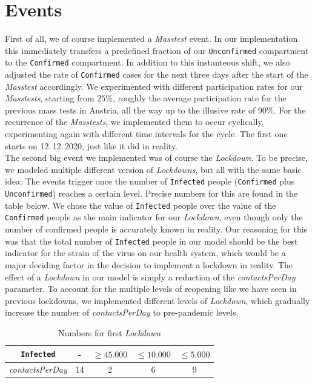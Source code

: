\documentclass
[
    a4paper,
    11pt,
    bibliography = totoc,
    listof = totoc,
    headinclude = true,
]
{scrreport}
\begin{document}
\section{Events}

First of all, we of course implemented a \textit{Masstest} event. In our implementation
this immediately transfers a predefined fraction of our \texttt{Unconfirmed} compartment
to the \texttt{Confirmed} compartment. In addition to this instanteous shift, we also
adjusted the rate of \texttt{Confirmed} cases for the next three days after the start of
the \textit{Masstest} accordingly. We experimented with different participation rates
for our \textit{Masstests}, starting from $25\%$, roughly the average participation rate
for the previous mass tests in Austria, all the way up to the illusive rate of $90\%$.
For the recurrence of the \textit{Masstests}, we implemented them to occur cyclically,
experimenting again with different time intervals for the cycle. The first one
starts on 12.\,12.\,2020, just like it did in reality.\\

The second big event we implemented was of course the \textit{Lockdown}. To be precise,
we modeled multiple different version of \textit{Lockdowns}, but all with the same basic idea:
The events trigger once the number of \texttt{Infected} people (\texttt{Confirmed} plus \texttt{Unconfirmed})
reaches a certain level. Precise numbers for this are found in the table below.
We chose the value of \texttt{Infected} people over the value of
the \texttt{Confirmed} people as the main indicator for our \textit{Lockdown}, even though only the number of confirmed people is accurately known in reality.
Our reasoning for this was that the total number of \texttt{Infected} people in our
model should be the best indicator for the strain of the virus on our health system,
which would be a major deciding factor in the decision to implement a lockdown in reality.
The effect of a \textit{Lockdown} in our model is simply a reduction of the \textit{contactsPerDay} parameter.
To account for the multiple levels of reopening like we have seen in previous
lockdowns, we implemented different levels of \textit{Lockdown}, which gradually increase
the number of \textit{contactsPerDay} to pre-pandemic levels.
\begin{table}[!h]
  \begin{center}
  \begin{tabular}{|c||c|c|c|c|}
  \hline
    \texttt{Infected} &- & $\geq 45.000$ & $\leq 10.000$ & $\leq 5.000$ \\
    \hline
    \textit{contactsPerDay} & 14 & 2 & 6 & 9 \\
    \hline
  \end{tabular}
  \end{center}
  \caption{Numbers for first \textit{Lockdown}}
\end{table}
\end{document}
